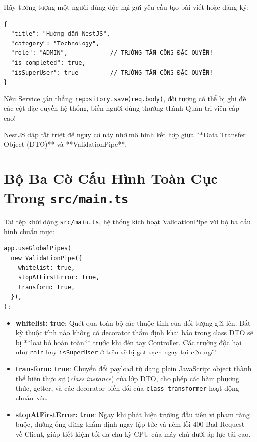 \documentclass[12pt,a4paper,oneside]{book}
\begin{document}
Hãy tưởng tượng một người dùng độc hại gửi yêu cầu tạo bài viết hoặc đăng ký:
\begin{codebox}
\begin{Verbatim}[fontsize=\small]
{
  "title": "Hướng dẫn NestJS",
  "category": "Technology",
  "role": "ADMIN",            // TRƯỜNG TẤN CÔNG ĐẶC QUYỀN!
  "is_completed": true,
  "isSuperUser": true         // TRƯỜNG TẤN CÔNG ĐẶC QUYỀN!
}
\end{Verbatim}
\end{codebox}
Nếu Service gán thẳng \texttt{repository.save(req.body)}, đối tượng có thể bị ghi đè các cột đặc quyền hệ thống, biến người dùng thường thành Quản trị viên cấp cao!

NestJS dập tắt triệt để nguy cơ này nhờ mô hình kết hợp giữa **Data Transfer Object (DTO)** và **ValidationPipe**.

\section{Bộ Ba Cờ Cấu Hình Toàn Cục Trong \texttt{src/main.ts}}
Tại tệp khởi động \texttt{src/main.ts}, hệ thống kích hoạt ValidationPipe với bộ ba cấu hình chuẩn mực:

\begin{codebox}
\begin{Verbatim}[fontsize=\small]
app.useGlobalPipes(
  new ValidationPipe({
    whitelist: true,
    stopAtFirstError: true,
    transform: true,
  }),
);
\end{Verbatim}
\end{codebox}

\begin{itemize}
  \item \textbf{whitelist: true}: Quét qua toàn bộ các thuộc tính của đối tượng gửi lên. Bất kỳ thuộc tính nào không có decorator thẩm định khai báo trong class DTO sẽ bị **loại bỏ hoàn toàn** trước khi đến tay Controller. Các trường độc hại như \texttt{role} hay \texttt{isSuperUser} ở trên sẽ bị gọt sạch ngay tại cửa ngõ!
  \item \textbf{transform: true}: Chuyển đổi payload từ dạng plain JavaScript object thành thể hiện thực sự (\textit{class instance}) của lớp DTO, cho phép các hàm phương thức, getter, và các decorator biến đổi của \texttt{class-transformer} hoạt động chuẩn xác.
  \item \textbf{stopAtFirstError: true}: Ngay khi phát hiện trường đầu tiên vi phạm ràng buộc, đường ống dừng thẩm định ngay lập tức và ném lỗi 400 Bad Request về Client, giúp tiết kiệm tối đa chu kỳ CPU của máy chủ dưới áp lực tải cao.
\end{itemize}
\end{document}
